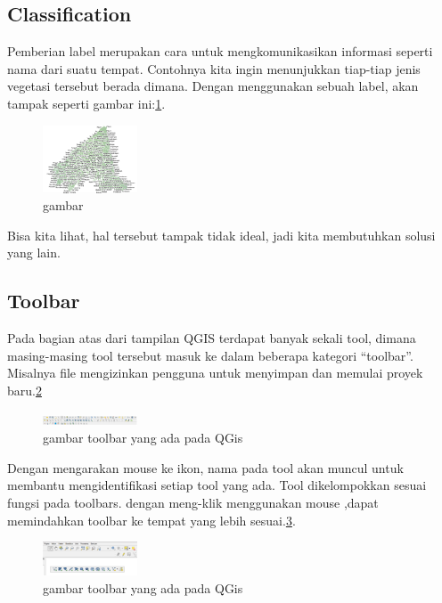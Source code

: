 \subsection{Classification}
Pemberian label merupakan cara untuk mengkomunikasikan informasi seperti nama dari suatu tempat. Contohnya kita ingin menunjukkan tiap-tiap jenis vegetasi tersebut berada dimana. Dengan menggunakan sebuah label, akan tampak seperti gambar ini:\ref{image13}.
\begin{figure}[ht]
        \centerline{\includegraphics[width=0.25\textwidth]{figures/image13}}
        \caption{gambar}
        \label{image13}
        \end{figure}
Bisa kita lihat, hal tersebut tampak tidak ideal, jadi kita membutuhkan solusi yang lain. 


\subsection{Toolbar}
Pada bagian atas dari tampilan QGIS terdapat banyak sekali tool, dimana masing-masing tool tersebut masuk ke dalam beberapa kategori “toolbar”. Misalnya file mengizinkan pengguna untuk menyimpan dan memulai proyek baru.\ref{toolbar}
\begin{figure}[ht]
    \centerline{\includegraphics[width=0.25\textwidth]{figures/toolbar}}
    \caption{gambar toolbar yang ada pada QGis}
    \label{toolbar}
    \end{figure}

Dengan mengarakan mouse ke ikon, nama pada tool akan muncul untuk membantu mengidentifikasi setiap tool yang ada. Tool dikelompokkan sesuai fungsi pada toolbars. dengan meng-klik menggunakan mouse ,dapat memindahkan toolbar ke tempat yang lebih sesuai.\ref{toolbar1}.
\begin{figure}[ht]
    \centerline{\includegraphics[width=0.25\textwidth]{figures/toolbar1}}
    \caption{gambar toolbar yang ada pada QGis}
    \label{toolbar1}
    \end{figure}
    
